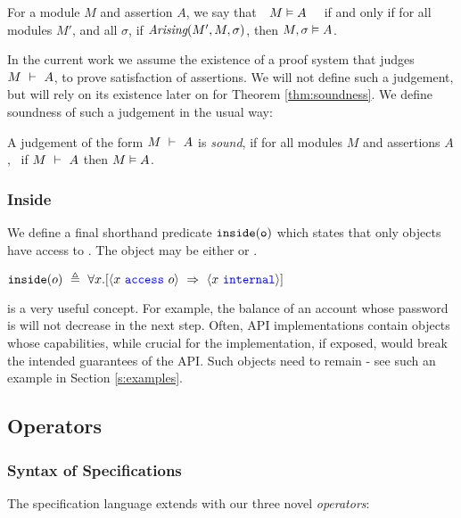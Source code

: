 \begin{definition}  
\label{def:mdl-sat}
For a module $M$ and assertion $A$, we say that\ \  $M \vDash A$ \ \ if and only if 
for all modules $M'$, and all $\sigma$, if $\textit{Arising}(M', M, \sigma)$, then $M , \sigma \vDash A$.
\end{definition}

 
In the current work we assume the existence of a proof system that judges
$M\ \vdash\ A$, to prove  satisfaction of assertions. 
 We will not define such a judgement, but will rely on its existence {later on for} Theorem \ref{thm:soundness}.
We define soundness of such a judgement in the usual way:

\begin{definition}
\label{ax:specW-prove-soundness}
A judgement of the form {$M\ \vdash\ A$} is \emph{sound}, if for all
 modules $M$ and assertions $A$, \ if $M\ \vdash\ A$ then $M \vDash A$.
\end{definition}

 
\subsubsection{Inside}

We define
a final shorthand 
predicate $\texttt{inside}( {\texttt{o}} )$ which states 
that only \internalO objects have access to .
The object  may be either \internalO or \externalO.
\begin{definition}[Inside]
$\wrapped{o}\ \triangleq\ \all{x}{\access{x}{o}\ \Rightarrow\ \internal{x}} $ 
\end{definition}

 
\inside is a very useful concept. For example, the balance of an account whose
  password is \inside  will not decrease in the next step.
  Often, API implementations contain objects whose capabilities, while  crucial for the implementation, if exposed,
would break the intended guarantees of the API. Such objects need to remain \inside - see
such an example in Section \ref{s:examples}. 
 


\subsection {\Nec Operators}
\label{s:holistic-guarantees}

\subsubsection{Syntax of \Nec Specifications}
The \Nec specification language extends \SpecO with our three novel 
 \jm[]{\Nec} \emph{operators}:


